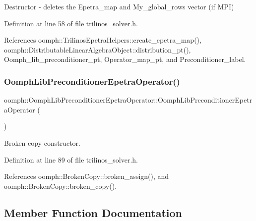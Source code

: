 Destructor -\/ deletes the Epetra\+\_\+map and My\+\_\+global\+\_\+rows vector (if M\+PI) 

Definition at line 58 of file trilinos\+\_\+solver.\+h.



References oomph\+::\+Trilinos\+Epetra\+Helpers\+::create\+\_\+epetra\+\_\+map(), oomph\+::\+Distributable\+Linear\+Algebra\+Object\+::distribution\+\_\+pt(), Oomph\+\_\+lib\+\_\+preconditioner\+\_\+pt, Operator\+\_\+map\+\_\+pt, and Preconditioner\+\_\+label.

\mbox{\label{classoomph_1_1OomphLibPreconditionerEpetraOperator_a14c3de93104f38c7b7185f8db2774a05}} 
\subsubsection{\texorpdfstring{Oomph\+Lib\+Preconditioner\+Epetra\+Operator()}{OomphLibPreconditionerEpetraOperator()}\hspace{0.1cm}{\footnotesize\ttfamily [2/2]}}
{\footnotesize\ttfamily oomph\+::\+Oomph\+Lib\+Preconditioner\+Epetra\+Operator\+::\+Oomph\+Lib\+Preconditioner\+Epetra\+Operator (\begin{DoxyParamCaption}\item[{const \hyperlink{classoomph_1_1OomphLibPreconditionerEpetraOperator}{Oomph\+Lib\+Preconditioner\+Epetra\+Operator} \&}]{ }\end{DoxyParamCaption})\hspace{0.3cm}{\ttfamily [inline]}}



Broken copy constructor. 



Definition at line 89 of file trilinos\+\_\+solver.\+h.



References oomph\+::\+Broken\+Copy\+::broken\+\_\+assign(), and oomph\+::\+Broken\+Copy\+::broken\+\_\+copy().



\subsection{Member Function Documentation}
\mbox{\label{classoomph_1_1OomphLibPreconditionerEpetraOperator_ade98cb5d53423f32f31a152f9dcc2ce6}} 
